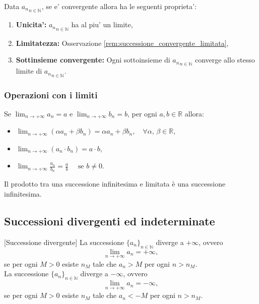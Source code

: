 \begin{proposition}
    Data ${a_n}_{n\in\mathbb N}$, se e' convergente allora ha le seguenti proprieta':
    \begin{enumerate}
        \item \textbf{Unicita':} ${a_n}_{n\in\mathbb N}$ ha al piu' un limite,
        \item \textbf{Limitatezza:} Osservazione \ref{rem:successione_convergente_limitata},
        \item \textbf{Sottinsieme convergente:} Ogni sottoinsieme di ${a_n}_{n\in\mathbb N}$ converge allo stesso limite di ${a_n}_{n\in\mathbb N}$.
    \end{enumerate}
\end{proposition}

\subsubsection{Operazioni con i limiti}

\begin{proposition}
    Se $\lim_{n\rightarrow+\infty}a_n=a$ e $\lim_{n\rightarrow+\infty}b_n=b$, per ogni $a,b\in\mathbb R$ allora:
    \begin{itemize}
        \item $\lim_{n\rightarrow+\infty}(\alpha a_n+\beta b_n)=\alpha a_n+\beta b_n,\quad \forall\alpha ,\,\beta\in\mathbb R,$
        \item $\lim_{n\rightarrow+\infty}(a_n\cdot b_n)=a\cdot b,$
        \item $\lim_{n\rightarrow+\infty}\frac{a_n}{b_n}=\frac{a}{b}\quad \text{ se } b\neq 0.$
    \end{itemize}
\end{proposition}

\begin{proposition}
    Il prodotto tra una successione infinitesima e limitata è una successione infinitesima.
\end{proposition}

\subsection{Successioni divergenti ed indeterminate}
\begin{definition}\label{def:successione_divergente}[Successione divergente]
    La successione $\{a_n\}_{n\in\mathbb N}$ diverge a $+\infty$, ovvero
    \begin{equation*}
        \lim_{n\rightarrow+\infty}a_n=+\infty,
    \end{equation*}
    se per ogni $M>0$ esiste $n_M$ tale che $a_n>M$ per ogni $n>n_M$.\\
    La successione $\{a_n\}_{n\in\mathbb N}$ diverge a $-\infty$, ovvero
    \begin{equation*}
        \lim_{n\rightarrow+\infty}a_n=-\infty,
    \end{equation*}
    se per ogni $M>0$ esiste $n_M$ tale che $a_n<-M$ per ogni $n>n_M$.    
\end{definition}

